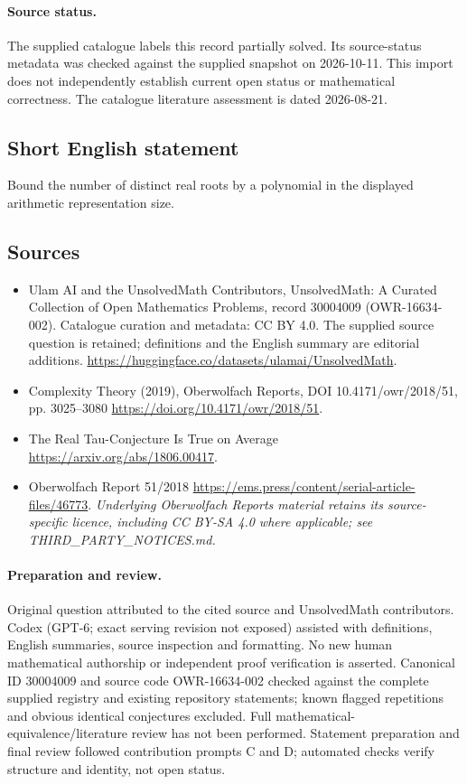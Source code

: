 \documentclass[11pt]{article}
\begin{document}
\paragraph{Source status.}
The supplied catalogue labels this record partially solved. Its source-status metadata was checked against the supplied snapshot on 2026-10-11. This import does not independently establish current open status or mathematical correctness. The catalogue literature assessment is dated 2026-08-21.
\subsection{Short English statement}
Bound the number of distinct real roots by a polynomial in the displayed arithmetic representation size.
\subsection{Sources}
\begin{itemize}
\item[\hypertarget{source:30004009:1}{S1}] Ulam AI and the UnsolvedMath Contributors, UnsolvedMath: A Curated Collection of Open Mathematics Problems, record 30004009 (OWR-16634-002). Catalogue curation and metadata: CC BY 4.0. The supplied source question is retained; definitions and the English summary are editorial additions.
\url{https://huggingface.co/datasets/ulamai/UnsolvedMath}.
\item[\hypertarget{source:30004009:2}{S2}] Complexity Theory (2019), Oberwolfach Reports, DOI 10.4171/owr/2018/51, pp. 3025--3080
\url{https://doi.org/10.4171/owr/2018/51}.
\item[\hypertarget{source:30004009:3}{S3}] The Real Tau-Conjecture Is True on Average
\url{https://arxiv.org/abs/1806.00417}.
\item[\hypertarget{source:30004009:4}{S4}] Oberwolfach Report 51/2018
\url{https://ems.press/content/serial-article-files/46773}.
\textit{Underlying Oberwolfach Reports material retains its source-specific licence, including CC BY-SA 4.0 where applicable; see THIRD\_PARTY\_NOTICES.md.}
\end{itemize}
\paragraph{Preparation and review.}
Original question attributed to the cited source and UnsolvedMath contributors. Codex (GPT-6; exact serving revision not exposed) assisted with definitions, English summaries, source inspection and formatting. No new human mathematical authorship or independent proof verification is asserted. Canonical ID 30004009 and source code OWR-16634-002 checked against the complete supplied registry and existing repository statements; known flagged repetitions and obvious identical conjectures excluded. Full mathematical-equivalence/literature review has not been performed. Statement preparation and final review followed contribution prompts C and D; automated checks verify structure and identity, not open status.
\label{end:30004009}
\end{document}
